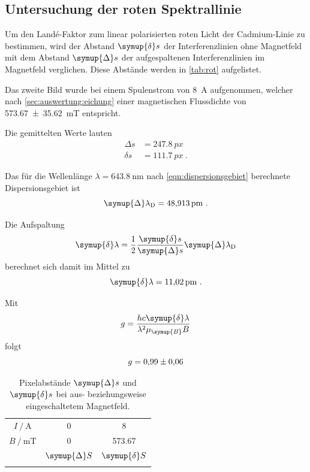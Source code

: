 \subsection{Untersuchung der roten Spektrallinie}
Um den Landé-Faktor zum linear polarisierten roten Licht der Cadmium-Linie zu bestimmen,
wird der Abstand $\symup{\delta} s$ der Interferenzlinien ohne Magnetfeld
mit dem Abstand $\symup{\Delta} s$ der aufgespaltenen Interferenzlinien im Magnetfeld verglichen.
Diese Abstände werden in \autoref{tab:rot} aufgelistet.

Das zweite Bild wurde bei einem Spulenstrom von \SI{8}{\ampere} aufgenommen,
welcher nach \autoref{sec:auswertung:eichung} einer magnetischen Flussdichte von \SI{573.67 \pm 35.62}{\milli\tesla} entspricht.

Die gemittelten Werte lauten
\begin{align*}
    Δs &= \SI{247.8}{px} \\
    δs &= \SI{111.7}{px} \ .
\end{align*}


Das für die Wellenlänge $\lambda = \SI{643.8}{\nano\meter}$ nach \autoref{eqn:dispersionsgebiet} berechnete Dispersionsgebiet ist
\[
    \symup{\Delta}\lambda_\text{D} = \SI{48.913}{\pico\meter} \ .
\]

Die Aufspaltung
\begin{equation}
    \label{eqn:delta_lambda}
    \symup{\delta} \lambda = \frac{1}{2} \frac{\symup{\delta} s}{\symup{\Delta} s} \symup{\Delta} \lambda_\text{D}
\end{equation}
berechnet sich damit im Mittel zu
\[
    \symup{\delta} \lambda = \SI{11.02}{\pico\meter} \ .
\]

Mit
\begin{equation}
    \label{eqn:g_mess}
    g = \frac{hc \symup{\delta} \lambda}{\lambda^2 \mu_{\symup{B}} B}
\end{equation}
folgt
\[
    g = \num{0.99 \pm 0.06}
\]


\begin{table}
    \centering
    \caption{Pixelabstände $\symup{\Delta} s$ und $\symup{\delta} s$ bei aus- beziehungsweise eingeschaltetem Magnetfeld.}
    \label{tab:rot}
    \begin{tabular}{S S S}
        \toprule
        {$I \mathbin{/} \si{\ampere}$} & 0 & 8 \\
        {$B \mathbin{/} \si{\milli\tesla}$} & 0 & 573.67  \\
        \midrule
        & {$\symup{\Delta} S$} & {$\symup{\delta} S$} \\
        \midrule
        \bottomrule
    \end{tabular}
\end{table}

